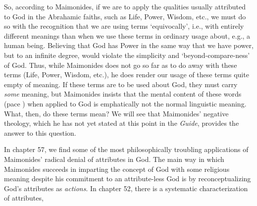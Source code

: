 \documentclass[12pt]{article}
\begin{document}
So, according to Maimonides, if we are to apply the qualities usually attributed to God in the Abrahamic faiths, such as Life, Power, Wisdom, etc., we must do so with the recognition that we are using terms `equivocally', i.e., with entirely different meanings than when we use these terms in ordinary usage about, e.g., a human being. Believing that God has Power in the same way that we have power, but to an infinite degree, would violate the simplicity and `beyond-compare-ness' of God. Thus, while Maimonides does not go so far as to do away with these terms (Life, Power, Wisdom, etc.), he does render our usage of these terms quite empty of meaning. If these terms are to be used about God, they must carry \emph{some} meaning, but Maimonides insists that the mental content of these words (pace \citeauthor{key2018language}) when applied to God is emphatically not the normal linguistic meaning. What, then, do these terms mean? We will see that Maimonides' negative theology, which he has not yet stated at this point in the \emph{Guide}, provides the answer to this question.

In chapter 57, we find some of the most philosophically troubling applications of Maimonides' radical denial of attributes in God. The main way in which Maimonides succeeds in imparting the concept of God with some religious meaning despite his commitment to an attribute-less God is by reconceptualizing God's attributes as \emph{actions}. In chapter 52, there is a systematic characterization of attributes, 

\vfill
\printbibliography
\end{document}
